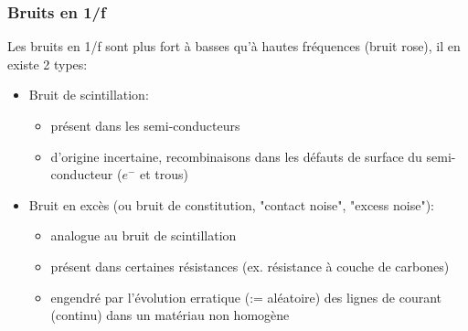 \subsubsection{Bruits en 1/f}
Les bruits en 1/f sont plus fort à basses qu'à hautes fréquences (bruit rose), il en existe 2 types:
\begin{itemize}
	\item Bruit de scintillation:
	\begin{itemize}
		\item présent dans les semi-conducteurs
		\item d'origine incertaine, recombinaisons dans les défauts de surface du semi-conducteur ($e^-$ et trous)
	\end{itemize}
	\item Bruit en excès (ou bruit de constitution, "contact noise", "excess noise"):
	\begin{itemize}
		\item analogue au bruit de scintillation
		\item présent dans certaines résistances (ex. résistance à couche de carbones)
		\item engendré par l'évolution erratique (:= aléatoire) des lignes de courant (continu) dans un matériau non homogène
	\end{itemize}
\end{itemize}
